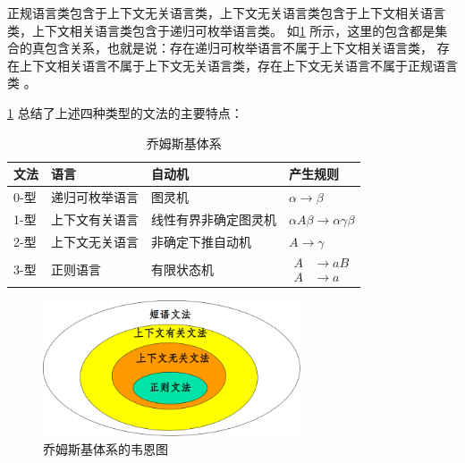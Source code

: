正规语言类包含于上下文无关语言类，上下文无关语言类包含于上下文相关语言类，上下文相关语言类包含于递归可枚举语言类。
如\cref{fig:ChomskyVenn} 所示，这里的包含都是集合的真包含关系，也就是说：存在递归可枚举语言不属于上下文相关语言类，
存在上下文相关语言不属于上下文无关语言类，存在上下文无关语言不属于正规语言类
\cite{DBLP:journals/iandc/Chomsky59a}。

\cref{tab:ChomskyModels} 总结了上述四种类型的文法的主要特点：
\begin{table}[H]
        \centering
        \caption{乔姆斯基体系}
        \label{tab:ChomskyModels}
        \begin{tabular}{|l|l|l|l|}
                \hline
                文法 & 语言 & 自动机 & 产生规则 \\
                \hline
                0-型 & 递归可枚举语言 & 图灵机 & $\alpha \rightarrow \beta$ \\
                \hline
                1-型 & 上下文有关语言 & 线性有界非确定图灵机 & $\alpha A \beta \rightarrow \alpha \gamma \beta$ \\
                \hline
                2-型 & 上下文无关语言 & 非确定下推自动机 & $A \rightarrow \gamma $ \\
                \hline
                3-型 & 正则语言 & 有限状态机 & 
                {$\begin{aligned}
                                A & \rightarrow aB \\
                                A & \rightarrow a
                \end{aligned}$} \tabularnewline
                \hline
        \end{tabular}
\end{table}

\begin{figure}[H]
        \centering
        \includegraphics[width=0.68\textwidth]{figure/chomsky_model.png}
        \caption{乔姆斯基体系的韦恩图}
        \label{fig:ChomskyVenn}
\end{figure}


